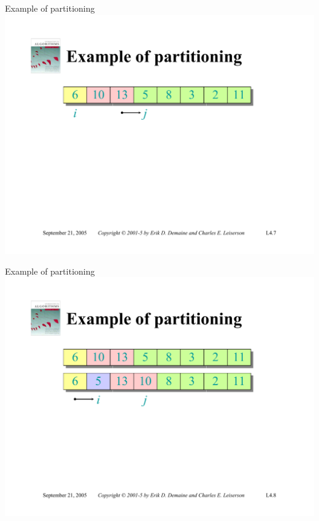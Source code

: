 \documentclass{beamer}
\begin{document}
\begin{frame}{Example of partitioning}
    \centering
    \includegraphics[width=\textwidth, trim={2.75cm 1.80cm 2.75cm 5.00cm}, clip]{pages/lec4_7}
\end{frame}
\begin{frame}{Example of partitioning}
    \centering
    \includegraphics[width=\textwidth, trim={2.75cm 1.80cm 2.75cm 5.00cm}, clip]{pages/lec4_8}
\end{frame}
\end{document}
